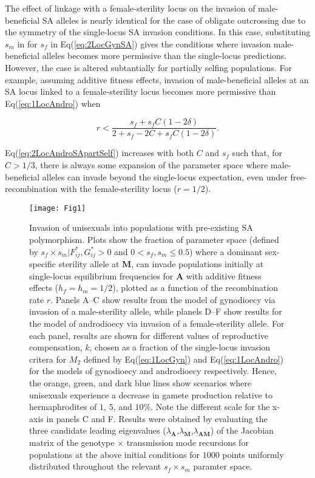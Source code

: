 \documentclass[9pt,twocolumn,twoside,lineno]{gsajnl}
\begin{document}
The effect of linkage with a female-sterility locus on the invasion of male-beneficial SA alleles is nearly identical for the case of obligate outcrossing due to the symmetry of the single-locus SA invasion conditions. In this case, substituting $s_m$ in for $s_f$ in Eq(\ref{eq:2LocGynSA}) gives the conditions where invasion male-beneficial alleles becomes more permissive than the single-locus predictions. However, the case is altered subtantially for partially selfing populations. For example, assuming additive fitness effects, invasion of male-beneficial alleles at an SA locus linked to a female-sterility locus becomes more permissive than Eq(\ref{eq:1LocAndro}) when

\begin{equation}\label{eq:2LocAndroSApartSelf}
	r < \frac{s_f + s_f C (1 - 2 \delta)}{2 + s_f - 2 C + s_f C (1 - 2 \delta)}.
\end{equation}

\noindent Eq(\ref{eq:2LocAndroSApartSelf}) increases with both $C$ and $s_f$ such that, for $C > 1/3$, there is always some expansion of the parameter space where male-beneficial alleles can invade beyond the single-locus expectation, even under free-recombination with the female-sterility locus ($r = 1/2$). 


\begin{figure}[htbp]
\centering
\texttt{[image: Fig1]}
\caption{Invasion of unisexuals into populations with pre-existing SA polymorphism. Plots show the fraction of parameter space (defined by $s_f \times s_m | F^{\ast}_{ij},G^{\ast}_{ij} > 0$ and $0 < s_f,s_m \leq 0.5$) where a dominant sex-specific sterility allele at $\mathbf{M}$, can invade populations initially at single-locus equilibrium frequencies for $\mathbf{A}$ with additive fitness effects ($h_f=h_m=1/2$), plotted as a function of the recombination rate $r$. Panels A--C show results from the model of gynodioecy via invasion of a male-sterility allele, while planels D--F show results for the model of androdioecy via invasion of a female-sterility allele. For each panel, results are shown for different values of reproductive compensation, $k$, chosen as a fraction of the single-locus invasion critera for $M_2$ defined by Eq(\ref{eq:1LocGyn}) and Eq(\ref{eq:1LocAndro}) for the models of gynodioecy and androdioecy respectively. Hence, the orange, green, and dark blue lines show scenarios where unisexuals experience a decrease in gamete production relative to hermaphrodites of $1$, $5$, and $10\%$. Note the different scale for the x-axis in panels C and F. Results were obtained by evaluating the three candidate leading eigenvalues ($\lambda_{\mathbf{A}}$,$\lambda_{\mathbf{M}}$,$\lambda_{\mathbf{AM}}$) of the Jacobian matrix of the genotype $\times$ transmission mode recursions for populations at the above initial conditions for $1000$ points uniformly distributed throughout the relevant $s_f \times s_m$ paramter space.}
\label{fig:PrInv}
\end{figure}
\end{document}
